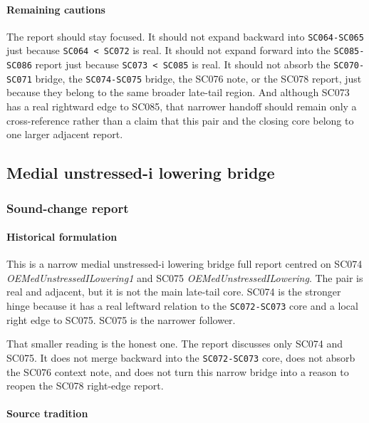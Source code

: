 \documentclass[
  british,
  a4paper,
]{article}
\begin{document}
\paragraph{Remaining cautions}\label{remaining-cautions-45}

The report should stay focused. It should not expand backward into
\texttt{SC064-SC065} just because \texttt{SC064\ \textless{}\ SC072} is
real. It should not expand forward into the \texttt{SC085-SC086} report
just because \texttt{SC073\ \textless{}\ SC085} is real. It should not
absorb the \texttt{SC070-SC071} bridge, the \texttt{SC074-SC075} bridge,
the SC076 note, or the SC078 report, just because they belong to the
same broader late-tail region. And although SC073 has a real rightward
edge to SC085, that narrower handoff should remain only a
cross-reference rather than a claim that this pair and the closing core
belong to one larger adjacent report.

\subsection{Medial unstressed-i lowering
bridge}\label{medial-unstressed-i-lowering-bridge}

\subsubsection{Sound-change report}\label{sound-change-report-46}

\paragraph{Historical formulation}\label{historical-formulation-46}

This is a narrow medial unstressed-i lowering bridge full report centred
on SC074 \emph{OEMedUnstressedILowering1} and SC075
\emph{OEMedUnstressedILowering}. The pair is real and adjacent, but it
is not the main late-tail core. SC074 is the stronger hinge because it
has a real leftward relation to the \texttt{SC072-SC073} core and a
local right edge to SC075. SC075 is the narrower follower.

That smaller reading is the honest one. The report discusses only SC074
and SC075. It does not merge backward into the \texttt{SC072-SC073}
core, does not absorb the SC076 context note, and does not turn this
narrow bridge into a reason to reopen the SC078 right-edge report.

\paragraph{Source tradition}\label{source-tradition-46}
\end{document}
